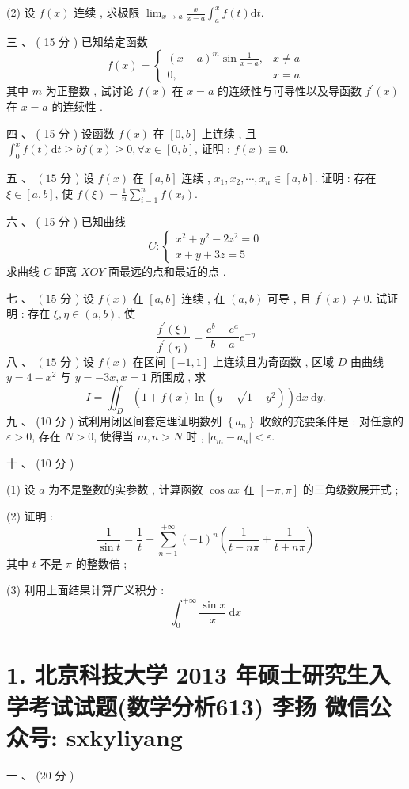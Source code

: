 \documentclass[10pt]{article}
\begin{document}
{(2)  设  $f(x)$  连续 ,  求极限  $\lim _{x \rightarrow a} \frac{x}{x-a} \int_{a}^{x} f(t) \mathrm{d} t$.

 三 、 ( 15  分 )  已知给定函数 
$$
f(x)= \begin{cases}(x-a)^{m} \sin \frac{1}{x-a}, & x \neq a \\ 0, & x=a\end{cases}
$$
 其中  $m$  为正整数 ,  试讨论  $f(x)$  在  $x=a$  的连续性与可导性以及导函数  $f^{\prime}(x)$  在  $x=a$  的连续性 .

 四 、 ( 15  分 )  设函数  $f(x)$  在  $[0, b]$  上连续 ,  且  $\int_{0}^{x} f(t) \mathrm{d} t \geq b f(x) \geq 0, \forall x \in[0, b]$,  证明 : $f(x) \equiv 0$.

 五 、 $\left(15\right.$  分 )  设  $f(x)$  在  $[a, b]$  连续 , $x_{1}, x_{2}, \cdots, x_{n} \in[a, b]$.  证明 :  存在  $\xi \in[a, b]$,  使  $f(\xi)=\frac{1}{n} \sum_{i=1}^{n} f\left(x_{i}\right)$.

 六 、 ( 15  分 )  已知曲线 
$$
C:\left\{\begin{array}{l}
x^{2}+y^{2}-2 z^{2}=0 \\
x+y+3 z=5
\end{array}\right.
$$
 求曲线  $C$  距离  $X O Y$  面最远的点和最近的点 .

 七 、 $\left(15\right.$  分 )  设  $f(x)$  在  $[a, b]$  连续 ,  在  $(a, b)$  可导 ,  且  $f^{\prime}(x) \neq 0$.  试证明 :  存在  $\xi, \eta \in(a, b)$,  使 
$$
\frac{f^{\prime}(\xi)}{f^{\prime}(\eta)}=\frac{e^{b}-e^{a}}{b-a} e^{-\eta}
$$
 八 、 $\left(15\right.$  分 )  设  $f(x)$  在区间  $[-1,1]$  上连续且为奇函数 ,  区域  $D$  由曲线  $y=4-x^{2}$  与  $y=-3 x, x=1$  所围成 ,  求 
$$
I=\iint_{D}\left(1+f(x) \ln \left(y+\sqrt{1+y^{2}}\right)\right) \mathrm{d} x \mathrm{~d} y .
$$
 九 、 (10  分 )  试利用闭区间套定理证明数列  $\left\{a_{n}\right\}$  收敛的充要条件是 :  对任意的  $\varepsilon>0$,  存在  $N>0$,  使得当  $m, n>N$  时 , $\left|a_{m}-a_{n}\right|<\varepsilon$.

 十 、 (10  分 )

(1)  设  $a$  为不是整数的实参数 ,  计算函数  $\cos a x$  在  $[-\pi, \pi]$  的三角级数展开式 ;

(2)  证明 :
$$
\frac{1}{\sin t}=\frac{1}{t}+\sum_{n=1}^{+\infty}(-1)^{n}\left(\frac{1}{t-n \pi}+\frac{1}{t+n \pi}\right)
$$
 其中  $t$  不是  $\pi$  的整数倍 ;

(3)  利用上面结果计算广义积分 :
$$
\int_{0}^{+\infty} \frac{\sin x}{x} \mathrm{~d} x
$$

\section{1. 北京科技大学 2013 年硕士研究生入学考试试题(数学分析613) 
 李扬 
 微信公众号: sxkyliyang}
 一 、 (20  分 )

}
\end{document}
